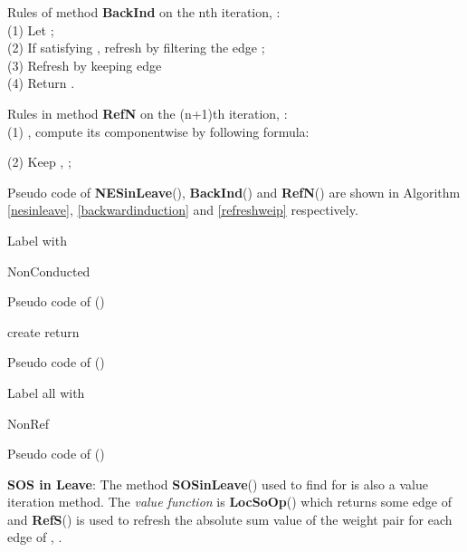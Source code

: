 \documentclass{acm_proc_article-sp}
\begin{document}
Rules of method \textbf{BackInd} on the nth iteration,  :\\
(1) Let ;\\
(2) If  satisfying , refresh  by filtering the edge ;\\
(3) Refresh  by keeping edge \\
(4) Return .

Rules in method \textbf{RefN} on the (n+1)th iteration, :\\
(1) , compute its   componentwise by following formula:

(2) Keep , ;

Pseudo code of \textbf{NESinLeave}(), \textbf{BackInd}() and \textbf{RefN}() are shown in Algorithm \ref{nesinleave}, \ref{backwardinduction} and \ref{refreshweip} respectively.
\begin{algorithm}[!h]
\scriptsize
 Label  with \begin{bf}NonConducted\end{bf}\;
 \;
 \;
 \caption{Pseudo code of ()}
 \label{nesinleave}
\end{algorithm}

\begin{algorithm}[!h]
\scriptsize
 \KwData{}
 create \;
 \;
 return \;
 \caption{Pseudo code of ()}
 \label{backwardinduction}
\end{algorithm}

\begin{algorithm}[!h]
\scriptsize
 \KwData{}
 \KwResult{, }
 Label all  with \begin{bf}NonRef\end{bf}\;
 \caption{Pseudo code of ()}
 \label{refreshweip}
\end{algorithm}


\textbf{SOS in Leave}: The method \textbf{SOSinLeave}() used to find  for   is also a value iteration method. The \textit{value function} is \textbf{LocSoOp}() which returns some edge  of  and \textbf{RefS}() is used to refresh the absolute sum value of the weight pair for each edge of , .
\end{document}
